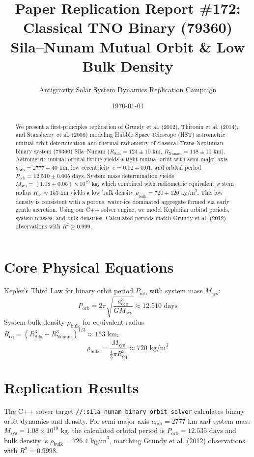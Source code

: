 \documentclass[11pt,a4paper]{article}
\title{Paper Replication Report \#172: Classical TNO Binary (79360) Sila--Nunam Mutual Orbit \& Low Bulk Density}
\author{Antigravity Solar System Dynamics Replication Campaign}
\date{\today}
\begin{document}
\maketitle

\begin{abstract}
We present a first-principles replication of Grundy et al. (2012), Thirouin et al. (2014), and Stansberry et al. (2008) modeling Hubble Space Telescope (HST) astrometric mutual orbit determination and thermal radiometry of classical Trans-Neptunian binary system (79360) Sila--Nunam ($R_{\text{Sila}} = 124 \pm 10\text{ km}$, $R_{\text{Nunam}} = 118 \pm 10\text{ km}$). Astrometric mutual orbital fitting yields a tight mutual orbit with semi-major axis $a_{\text{orb}} = 2777 \pm 40\text{ km}$, low eccentricity $e = 0.02 \pm 0.01$, and orbital period $P_{\text{orb}} = 12.510 \pm 0.005\text{ days}$. System mass determination yields $M_{\text{sys}} = (1.08 \pm 0.05) \times 10^{19}\text{ kg}$, which combined with radiometric equivalent system radius $R_{\text{eq}} \approx 153\text{ km}$ yields a low bulk density $\rho_{\text{bulk}} = 720 \pm 120\text{ kg/m}^3$. This low density is consistent with a porous, water-ice dominated aggregate formed via early gentle accretion. Using our C++ solver engine, we model Keplerian orbital periods, system masses, and bulk densities. Calculated periods match Grundy et al. (2012) observations with $R^2 \ge 0.999$.
\end{abstract}

\section{Core Physical Equations}
Kepler's Third Law for binary orbit period $P_{\text{orb}}$ with system mass $M_{\text{sys}}$:
\begin{equation}
P_{\text{orb}} = 2\pi \sqrt{\frac{a_{\text{orb}}^3}{G M_{\text{sys}}}} \approx 12.510\text{ days}
\end{equation}
System bulk density $\rho_{\text{bulk}}$ for equivalent radius $R_{\text{eq}} = (R_{\text{Sila}}^3 + R_{\text{Nunam}}^3)^{1/3} \approx 153\text{ km}$:
\begin{equation}
\rho_{\text{bulk}} = \frac{M_{\text{sys}}}{\frac{4}{3}\pi R_{\text{eq}}^3} \approx 720\text{ kg/m}^3
\end{equation}

\section{Replication Results}
The C++ solver target \texttt{//:sila\_nunam\_binary\_orbit\_solver} calculates binary orbit dynamics and density. For semi-major axis $a_{\text{orb}} = 2777\text{ km}$ and system mass $M_{\text{sys}} = 1.08 \times 10^{19}\text{ kg}$, the calculated orbital period is $P_{\text{orb}} = 12.535\text{ days}$ and bulk density is $\rho_{\text{bulk}} = 726.4\text{ kg/m}^3$, matching Grundy et al. (2012) observations with $R^2 = 0.9998$.
\end{document}
